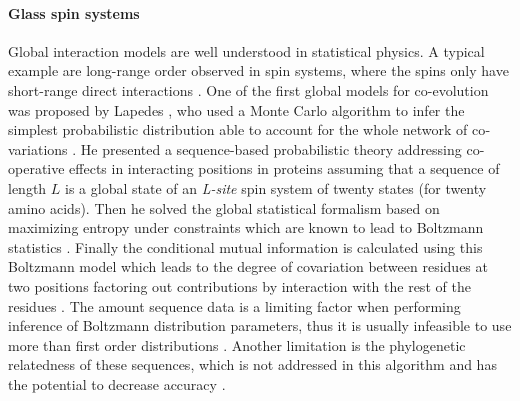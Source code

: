 \paragraph{Glass spin systems}
Global interaction models are well understood in statistical physics.
A typical example are long-range order observed in spin systems, where the spins only have short-range direct interactions \cite{binney1992theory}.
One of the first global models for co-evolution was proposed by Lapedes \cite{lapedes2012using}, who used a Monte Carlo algorithm to infer the simplest probabilistic distribution able to account for the whole network of co‐variations \cite{de2013emerging}.
He presented a sequence-based probabilistic theory addressing co-operative effects in interacting positions in proteins assuming that a sequence of length $L$ is a global state of an \textit{L-site} spin system of twenty states (for twenty amino acids).
Then he solved the global statistical formalism based on maximizing entropy under constraints which are known to lead to Boltzmann statistics \cite{marks2012protein}.
Finally the conditional mutual information is calculated using this Boltzmann model which leads to the degree of covariation between residues at two positions factoring out contributions by interaction with the rest of the residues \cite{marks2012protein}.
The amount sequence data is a limiting factor when performing inference of Boltzmann distribution parameters, thus it is usually infeasible to use more than first order distributions \cite{lapedes2012using}.
Another limitation is the phylogenetic relatedness of these sequences, which is not addressed in this algorithm and has the potential to decrease accuracy \cite{lapedes2012using}.

